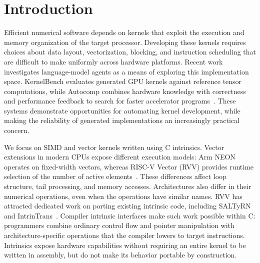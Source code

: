 \section{Introduction}
\label{sec:intro}

Efficient numerical software depends on kernels that exploit the execution and memory organization of the target processor. Developing these kernels requires choices about data layout, vectorization, blocking, and instruction scheduling that are difficult to make uniformly across hardware platforms. Recent work investigates language-model agents as a means of exploring this implementation space. KernelBench evaluates generated GPU kernels against reference tensor computations, while Autocomp combines hardware knowledge with correctness and performance feedback to search for faster accelerator programs~\cite{kernelbench,autocomp}. These systems demonstrate opportunities for automating kernel development, while making the reliability of generated implementations an increasingly practical concern.

We focus on SIMD and vector kernels written using C intrinsics. Vector extensions in modern CPUs expose different execution models: Arm NEON operates on fixed-width vectors, whereas RISC-V Vector (RVV) provides runtime selection of the number of active elements~\cite{acle,rvv}. These differences affect loop structure, tail processing, and memory accesses. Architectures also differ in their numerical operations, even when the operations have similar names. RVV has attracted dedicated work on porting existing intrinsic code, including SALTyRN and IntrinTrans~\cite{saltyrn,intrintrans}. Compiler intrinsic interfaces make such work possible within C: programmers combine ordinary control flow and pointer manipulation with architecture-specific operations that the compiler lowers to target instructions. Intrinsics expose hardware capabilities without requiring an entire kernel to be written in assembly, but do not make its behavior portable by construction.

